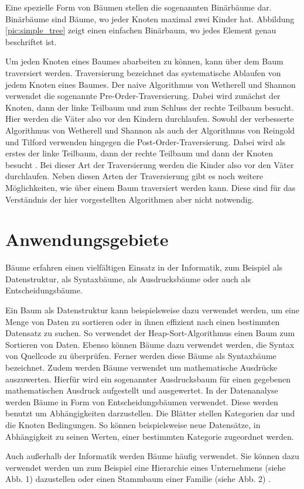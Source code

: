 Eine spezielle Form von Bäumen stellen die sogenannten Binärbäume dar. 
Binärbäume sind Bäume, wo jeder Knoten maximal zwei Kinder hat. Abbildung \ref{pic:simple_tree} 
zeigt einen einfachen Binärbaum, wo jedes Element genau beschriftet ist. 

Um jeden Knoten eines Baumes abarbeiten zu können, kann über dem Baum 
traversiert werden. Traversierung bezeichnet das systematische Ablaufen 
von jedem Knoten eines Baumes. Der naive Algorithmus
von Wetherell und Shannon verwendet die sogenannte
Pre-Order-Traversierung. Dabei wird zunächst der Knoten, dann der linke Teilbaum
und zum Schluss der rechte Teilbaum besucht. Hier werden die Väter also vor den
Kindern durchlaufen. Sowohl der verbesserte Algorithmus von Wetherell 
und Shannon als auch der Algorithmus von Reingold und Tilford verwenden hingegen die 
Post-Order-Traversierung. Dabei wird als erstes der linke Teilbaum, dann der 
rechte Teilbaum und dann der Knoten besucht \cite[]{q4}. Bei dieser Art der 
Traversierung werden die Kinder also vor den Väter durchlaufen. Neben diesen Arten
der Traversierung gibt es noch weitere Möglichkeiten, wie über einem 
Baum traversiert werden kann. Diese sind für das Verständnis der hier 
vorgestellten Algorithmen aber nicht notwendig.


\section{Anwendungsgebiete}

Bäume erfahren einen vielfältigen Einsatz in der Informatik, zum Beispiel 
als Datenstruktur, als Syntaxbäume, als Ausdrucksbäume oder auch als 
Entscheidungsbäume.

Ein Baum als Datenstruktur kann beispielsweise dazu verwendet werden, 
um eine Menge von Daten zu sortieren oder in ihnen effizient nach einen 
bestimmten Datensatz zu suchen. So verwendet der Heap-Sort-Algorithmus 
einen Baum zum Sortieren von Daten. Ebenso können Bäume dazu verwendet 
werden, die Syntax von Quellcode zu überprüfen. Ferner werden diese Bäume 
als Syntaxbäume bezeichnet. Zudem werden Bäume verwendet um mathematische 
Ausdrücke auszuwerten. Hierfür wird ein sogenannter Ausdrucksbaum für einen 
gegebenen mathematischen Ausdruck aufgestellt und ausgewertet. In der 
Datenanalyse werden Bäume in Form von Entscheidungsbäumen verwendet. 
Diese werden benutzt um Abhängigkeiten darzustellen. Die Blätter stellen 
Kategorien dar und die Knoten Bedingungen. So können beispielsweise neue 
Datensätze, in Abhängigkeit zu seinen Werten, einer bestimmten Kategorie 
zugeordnet werden.

Auch außerhalb der Informatik werden Bäume häufig verwendet. Sie können 
dazu verwendet werden um zum Beispiel eine Hierarchie eines Unternehmens 
(siehe Abb. 1) dazustellen oder einen Stammbaum einer 
Familie (siehe Abb. 2) \cite[]{q4}.

